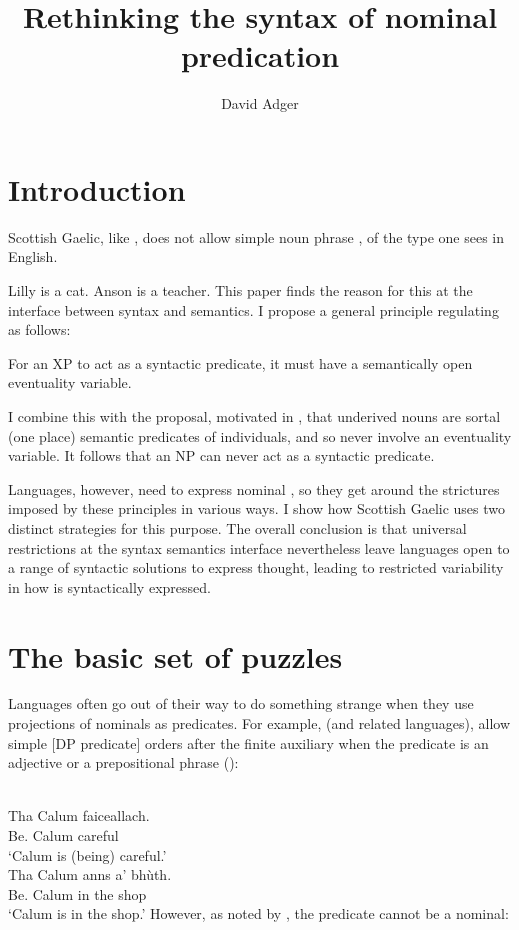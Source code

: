 \documentclass[output=paper]{langsci/langscibook}
\author{David Adger\affiliation{Queen Mary University of London}}
\title{Rethinking the syntax of nominal predication}
\begin{document}
\glsresetall

\section{Introduction}

Scottish Gaelic, like , does not allow simple noun phrase , of
the type one sees in English.

\ea
\ea Lilly is a cat.
\ex Anson is a teacher.
\z
\z
This paper finds the reason for this at the interface between syntax and
semantics. I propose a general principle regulating  as follows:

\ea For an XP to act as a syntactic predicate, it must have a semantically open
eventuality variable.
\z

I combine this with the proposal, motivated in \textcite{adgerbook}, that
underived nouns are sortal (one place) semantic predicates of individuals, and
so never involve an eventuality variable. It follows that an NP can never act
as a syntactic predicate.

Languages, however, need to express nominal , so they get around the
strictures imposed by these principles in various ways. I show how Scottish
Gaelic uses two distinct strategies for this purpose.  The overall conclusion
is that universal restrictions at the syntax semantics interface nevertheless
leave languages open to a range of syntactic solutions to express thought,
leading to restricted variability in how  is syntactically
expressed.

\section{The basic set of puzzles}

Languages often go out of their way to do something strange when they use
projections of nominals as predicates. For example,  (and
related  languages), allow simple [DP predicate] orders after the finite
auxiliary when the predicate is an adjective or a prepositional phrase
(\citealt{chung-mccloskey:87}):

\ea {}\\
\gll Tha  Calum  faiceallach.\\
Be.\Prs{}  Calum  careful\\
\glt \enquote*{Calum is (being) careful.}
\ex  {}\\
\gll Tha  Calum  anns a' bh\`uth.\\
Be.\Prs{}  Calum  in the shop \\
\glt \enquote*{Calum is in the shop.}
\z
However, as noted by \citet{adger-ramchand:03}, the predicate cannot be a
nominal:
\end{document}
